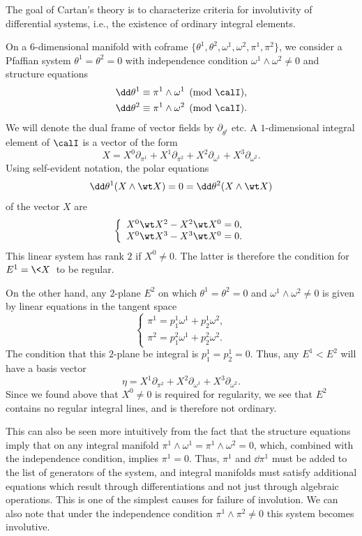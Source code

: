 The goal of Cartan's theory is to characterize criteria for involutivity of differential systems, i.e., the existence of ordinary integral elements. 


\begin{example}
    On a $6$-dimensional manifold with coframe $\{\theta^1,\theta^2,\omega^1,\omega^2,\pi^1,\pi^2\}$, we consider a Pfaffian system $\theta^1=\theta^2=0$ with independence condition $\omega^1\wedge\omega^2\neq 0$ and structure equations 
    \begin{align}
        \dd\theta^1\equiv \pi^1\wedge\omega^1 \pmod{\calI},\\
        \dd\theta^2\equiv \pi^1\wedge\omega^2\pmod{\calI}.
    \end{align}
    We will denote the dual frame of vector fields by $\partial_{\theta^i}$ etc. A $1$-dimensional integral element of $\calI$ is a vector of the form 
    \[X=X^0\partial_{\pi^1}+X^1\partial_{\pi^2}+X^2\partial_{\omega^1}+X^3\partial_{\omega^2}.\]
    Using self-evident notation, the polar equations 
    \[\dd\theta^1(X\wedge\wt X)=0=\dd\theta^2(X\wedge\wt X)\]
    of the vector $X$ are 
    \[\left\{\begin{array}{l}
                X^0\wt X^2-X^2 \wt X^0=0,\\
                X^0\wt X^3-X^3 \wt X^0=0.        
    \end{array}\right.\]
    This linear system has rank $2$ if $X^0\neq 0$. The latter is therefore the condition for $E^1=\<X\>$ to be regular.

    On the other hand, any $2$-plane $E^2$ on which $\theta^1=\theta^2=0$ and $\omega^1\wedge\omega^2\neq 0$ is given by linear equations in the tangent space 
    \[\left\{\begin{array}{l}
        \pi^1=p_1^1\omega^1+p^1_2\omega^2,\\
        \pi^2=p^2_1\omega^1+p^2_2\omega^2.        
    \end{array}\right.\]
    The condition that this $2$-plane be integral is $p^1_1=p^1_2=0$. Thus, any $E^1<E^2$ will have a basis vector 
    \[\eta=X^1\partial_{\pi^2}+X^2\partial_{\omega^1}+X^3\partial_{\omega^2}.\]
    Since we found above that $X^0\neq 0$ is required for regularity, we see that $E^2$ contains no regular integral lines, and is therefore not ordinary. 

    This can also be seen more intuitively from the fact that the structure equations imply that on any integral manifold $\pi^1\wedge\omega^1=\pi^1\wedge\omega^2=0$, which, combined with the independence condition, implies $\pi^1=0$. Thus, $\pi^1$ and $\dd\pi^1$ must be added to the list of generators of the system, and integral manifolds must satisfy additional equations which result through differentiations and not just through algebraic operations. This is one of the simplest causes for failure of involution. We can also note that under the independence condition $\pi^1\wedge\pi^2\neq 0$ this system becomes involutive.
\end{example}

